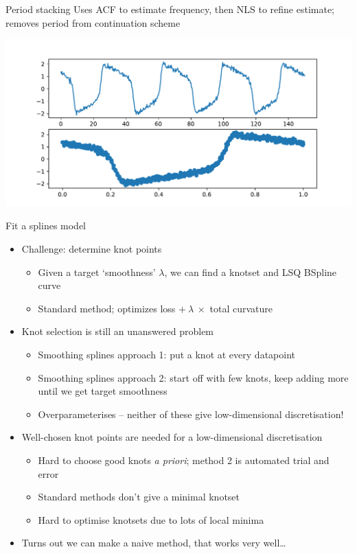 \documentclass[presentation]{beamer}
\begin{document}
\begin{frame}[label={sec:orge347f9e}]{Period stacking}
Uses ACF to estimate frequency, then NLS to refine estimate; removes period from continuation scheme

\begin{center}
\includegraphics[width=.9\linewidth]{./period_stack2.pdf}
\end{center}
\end{frame}

\begin{frame}[label={sec:org39cd4d4}]{Fit a splines model}
\begin{itemize}[<+->]
\item Challenge: determine knot points
\begin{itemize}
\item Given a target `smoothness' \(\lambda\), we can find a knotset and LSQ BSpline curve
\item Standard method; optimizes loss \(+~\lambda~\times\) total curvature
\end{itemize}
\item Knot selection is still an unanswered problem
\begin{itemize}
\item Smoothing splines approach 1: put a knot at every datapoint
\item Smoothing splines approach 2: start off with few knots, keep adding more until we get target smoothness
\item Overparameterises -- neither of these give low-dimensional discretisation!
\end{itemize}
\item Well-chosen knot points are needed for a low-dimensional discretisation
\begin{itemize}
\item Hard to choose good knots \emph{a priori}; method 2 is automated trial and error
\item Standard methods don't give a minimal knotset
\item Hard to optimise knotsets due to lots of local minima
\end{itemize}
\item \alert{Turns out we can make a naive method, that works very well\ldots{}}
\end{itemize}
\end{frame}
\end{document}
